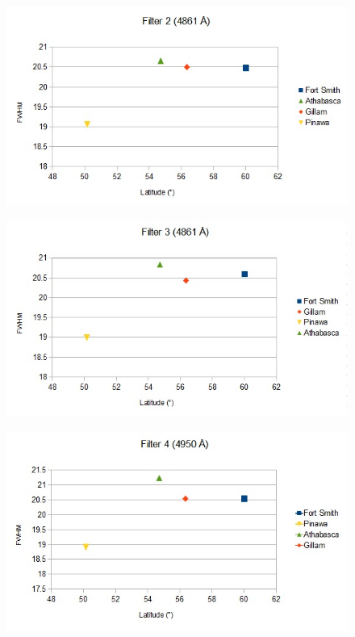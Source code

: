 \documentclass[11pt]{article}
\begin{document}
\begin{figure}[h!]
\includegraphics[scale=1.0]{filter2_FWHM.jpg}
\end{figure}

\begin{figure}[h!]
\includegraphics[scale=1.0]{filter3_FWHM.jpg}
\end{figure}

\begin{figure}[h!]
\includegraphics[scale=1.0]{filter4_FWHM.jpg}
\end{figure}
\end{document}
